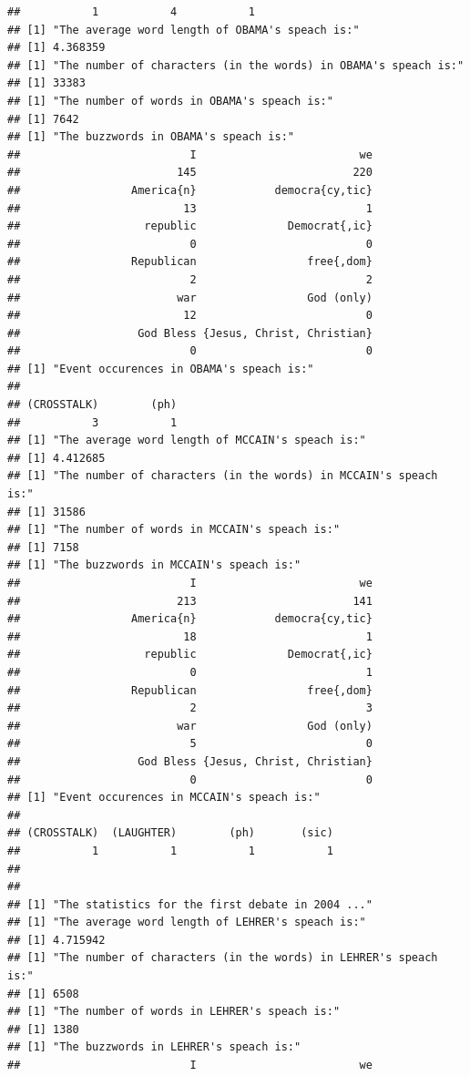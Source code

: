 \documentclass{article}\usepackage[]{graphicx}\usepackage[]{color}
\makeatletter
\newenvironment{kframe}{%
 \def\at@end@of@kframe{}%
 \ifinner\ifhmode%
  \def\at@end@of@kframe{\end{minipage}}%
  \begin{minipage}{\columnwidth}%
 \fi\fi%
 \def\FrameCommand##1{\hskip\@totalleftmargin \hskip-\fboxsep
 \colorbox{shadecolor}{##1}\hskip-\fboxsep
     \hskip-\linewidth \hskip-\@totalleftmargin \hskip\columnwidth}%
 \MakeFramed {\advance\hsize-\width
   \@totalleftmargin\z@ \linewidth\hsize
   \@setminipage}}%
 {\par\unskip\endMakeFramed%
 \at@end@of@kframe}
\newenvironment{knitrout}{}{} %
\makeatother
\begin{document}
\begin{knitrout}
\begin{kframe}
\begin{verbatim}
##           1           4           1 
## [1] "The average word length of OBAMA's speach is:"
## [1] 4.368359
## [1] "The number of characters (in the words) in OBAMA's speach is:"
## [1] 33383
## [1] "The number of words in OBAMA's speach is:"
## [1] 7642
## [1] "The buzzwords in OBAMA's speach is:"
##                          I                         we 
##                        145                        220 
##                 America{n}            democra{cy,tic} 
##                         13                          1 
##                   republic              Democrat{,ic} 
##                          0                          0 
##                 Republican                 free{,dom} 
##                          2                          2 
##                        war                 God (only) 
##                         12                          0 
##                  God Bless {Jesus, Christ, Christian} 
##                          0                          0 
## [1] "Event occurences in OBAMA's speach is:"
## 
## (CROSSTALK)        (ph) 
##           3           1 
## [1] "The average word length of MCCAIN's speach is:"
## [1] 4.412685
## [1] "The number of characters (in the words) in MCCAIN's speach is:"
## [1] 31586
## [1] "The number of words in MCCAIN's speach is:"
## [1] 7158
## [1] "The buzzwords in MCCAIN's speach is:"
##                          I                         we 
##                        213                        141 
##                 America{n}            democra{cy,tic} 
##                         18                          1 
##                   republic              Democrat{,ic} 
##                          0                          1 
##                 Republican                 free{,dom} 
##                          2                          3 
##                        war                 God (only) 
##                          5                          0 
##                  God Bless {Jesus, Christ, Christian} 
##                          0                          0 
## [1] "Event occurences in MCCAIN's speach is:"
## 
## (CROSSTALK)  (LAUGHTER)        (ph)       (sic) 
##           1           1           1           1 
## 
## 
## [1] "The statistics for the first debate in 2004 ..."
## [1] "The average word length of LEHRER's speach is:"
## [1] 4.715942
## [1] "The number of characters (in the words) in LEHRER's speach is:"
## [1] 6508
## [1] "The number of words in LEHRER's speach is:"
## [1] 1380
## [1] "The buzzwords in LEHRER's speach is:"
##                          I                         we 

\end{verbatim}
\end{kframe}
\end{knitrout}
\end{document}
